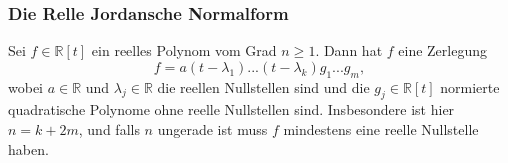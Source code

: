 \documentclass[8pt, a4paper, twocolumn, landscape]{article}
\newcommand{\comment}[1]{}
\begin{document}

\comment{

\begin{remark}
\bt{Rechenverfahren: Basiswechselmatrix einer Jordan-Normalform}
\begin{enumerate}
\item Bestimme die Eigenwerte $\lambda_1, ... \lambda_k$ der Matrix $A \in M(n \times n; K)$. Das folgende Verfahren muss f\uee r jeden Eigenwert durchgef\uee hrt werdemn
\item Sei $U = A - \lambda_i E_n$.

Bestimme $Ker(U), ..., Ker(U^q)$ wobei $q= min\{l \ | \ Ker(U^l) = Ker(U^{l+1})\}$. 
\item Bestimme die Gr\oee sse der Jordanbl\oee cke des Eigenwerts $\lambda_i$.
\item F\uee r einen Jordanblock der Gr\oee sse $j$ bestimme einen Vektor $v_j^{(i)} \in Ker(U^q) / Ker(U^{q-1})$ zum Eigenwert $\lambda_i$. Dann ist $v_{k-1}{(i)} = (A - \lambda_i E_n)(v_k) $ f\uee r all $k = 1, ..., j-1.$
\item $\mathcal{B} = (v_1^{(1)}, ..., v_j^{(1)}, ..., v_1^{(k)}, ..., v_j^{(k)})$ ist die gesuchte Basis.

\end{enumerate}
\end{remark}
}

\subsubsection{Die Relle Jordansche Normalform}
\begin{theorem}
Sei $f \in \mathbb{R}[t]$ ein reelles Polynom vom Grad $n \geq 1$. Dann hat $f$ eine Zerlegung
$$
f = a(t - \lambda_1)...(t- \lambda_k)g_1...g_m,
$$
wobei $a \in \mathbb{R}$ und $\lambda_j \in \mathbb{R}$ die reellen Nullstellen sind und die $g_j \in \mathbb{R}[t]$ normierte quadratische Polynome ohne reelle Nullstellen sind. Insbesondere ist hier $n = k + 2m$, und falls $n$ ungerade ist muss $f$ mindestens eine reelle Nullstelle haben.
\end{theorem}

\end{document}

